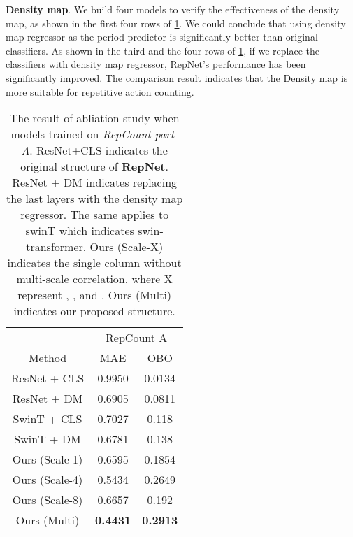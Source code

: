 \documentclass[10pt,twocolumn,letterpaper]{article}
\begin{document}
\noindent \textbf{Density map}. We build four models to verify the effectiveness of the density map, as shown in the first four rows of \cref{tab:ablation}. We could conclude that using density map regressor as the period predictor is significantly better than original classifiers. As shown in the third and the four rows of \cref{tab:ablation}, if we replace the classifiers with density map regressor, RepNet's performance has been significantly improved. The comparison result indicates that the Density map is more suitable for repetitive action counting. 

\begin{table}[ht]
	\begin{center}
		\begin{tabular}{c|cc}
			\hline
			                                    & \multicolumn{2}{c}{RepCount A}                         \\ \cline{1-3}
			Method                              & \multicolumn{1}{c|}{MAE} & OBO   \\ \cline{1-3}
			ResNet  \cite{ResNet} + CLS          & \multicolumn{1}{c|}{0.9950}          & 0.0134          \\
			ResNet  \cite{ResNet} + DM           & \multicolumn{1}{c|}{0.6905}          & 0.0811          \\
			SwinT \cite{swin-transformer} + CLS & \multicolumn{1}{c|}{0.7027}          & 0.118           \\
			SwinT \cite{swin-transformer} + DM  & \multicolumn{1}{c|}{0.6781}          & 0.138           \\
Ours (Scale-1)                             & \multicolumn{1}{c|}{0.6595} & 0.1854                  \\
            Ours (Scale-4)                             & \multicolumn{1}{c|}{0.5434} & 0.2649                                  \\
            Ours (Scale-8)   & \multicolumn{1}{c|}{0.6657} & 0.192  \\
			Ours (Multi)                       & \multicolumn{1}{c|}{\textbf{0.4431}} & \textbf{0.2913} \\ \cline{1-3}
		\end{tabular}
	\end{center}
	\caption{
		The result of abliation study when models trained on \emph{RepCount part-A}.
		ResNet+CLS indicates the original structure of \textbf{RepNet}\cite{RepNet}. ResNet + DM indicates replacing the last layers with the density map regressor. The same applies to swinT which indicates swin-transformer. Ours (Scale-X) indicates the single column without multi-scale correlation, where X represent , , and . Ours (Multi) indicates our proposed structure.
	}

	\label{tab:ablation}

\end{table}
\end{document}
